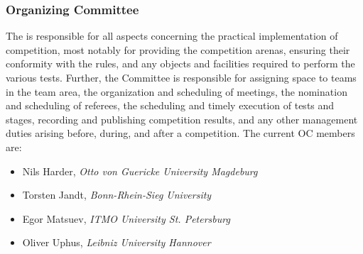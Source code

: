 \subsubsection{Organizing Committee}
The  is responsible for all aspects concerning the practical implementation of competition, most notably for providing the competition arenas, ensuring their conformity with the rules, and any objects and facilities required to perform the various tests. Further, the Committee is responsible for assigning space to teams in the team area, the organization and scheduling of meetings, the nomination and scheduling of referees, the scheduling and timely execution of tests and stages, recording and publishing competition results, and any other management duties arising before, during, and after a competition. The current OC members are:

\begin{itemize}
    \item Nils Harder, \textit{Otto von Guericke University Magdeburg}
    \item Torsten Jandt, \textit{Bonn-Rhein-Sieg University}
    \item Egor Matsuev, \textit{ITMO University St. Petersburg}
    \item Oliver Uphus, \textit{Leibniz University Hannover}
\end{itemize}






